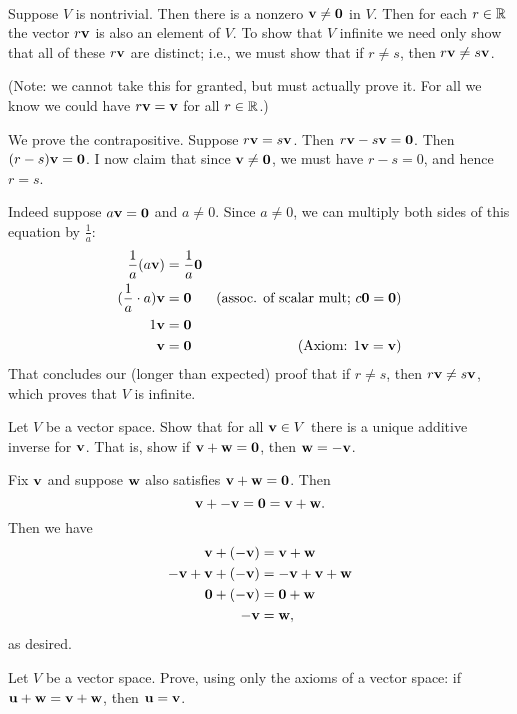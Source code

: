 \\
\begin{solution}
Suppose $V$ is nontrivial. Then there is a nonzero ${\mathbf v}\ne {\mathbf 0}$ in $V$. Then for each $r\in{\mathbb R}$ the vector $r{\mathbf v}$ is also an element of $V$. To show that $V$ infinite we need only show that all of these $r{\mathbf v}$ are distinct; i.e., we must show that if $r\ne s$, then $r{\mathbf v}\ne s{\mathbf v}$. 

(Note: we cannot take this for granted, but must actually prove it. For all we know we could have $r{\mathbf v}={\mathbf v}$ for all $r\in{\mathbb R}$.) 

We prove the contrapositive. Suppose $r{\mathbf v}=s{\mathbf v}$. Then $r{\mathbf v}-s{\mathbf v}={\mathbf 0}$. Then $(r-s){\mathbf v}={\mathbf 0}$. I now claim that since ${\mathbf v}\ne{\mathbf 0}$, we must have $r-s=0$, and hence $r=s$. 

Indeed suppose $a{\mathbf v}={\mathbf 0}$ and $a\ne 0$. Since $a\ne 0$, we can multiply both sides of this equation by $\frac{1}{a}$:
\begin{align*}
\frac{1}{a}(a{\mathbf v})&=\frac{1}{a}{\mathbf 0}\\
(\frac{1}{a}\cdot a){\mathbf v}&={\mathbf 0} &\text{(assoc. of scalar mult; $c{\mathbf 0}={\mathbf 0}$)}\\
1{\mathbf v}&={\mathbf 0}\\
{\mathbf v}&={\mathbf 0} &\text{(Axiom: $1{\mathbf v}={\mathbf v}$)}
\end{align*}
That concludes our (longer than expected) proof that if $r\ne s$, then $r{\mathbf v}\ne s{\mathbf v}$, which proves that $V$ is infinite. 
\end{solution}
\ii Let $V$ be a vector space. Show that for all ${\mathbf v}\in V$ there is a unique additive inverse for ${\mathbf v}$. That is, show if ${\mathbf v}+{\mathbf w}={\mathbf 0}$, then ${\mathbf w}=-{\mathbf v}$.  
\\
\begin{solution}
Fix ${\mathbf v}$ and suppose ${\mathbf w}$ also satisfies ${\mathbf v}+{\mathbf w}={\mathbf 0}$. Then  
\[
{\mathbf v}+-{\mathbf v}={\mathbf 0}={\mathbf v}+{\mathbf w}.
\]
Then we have 
\begin{align*}
{\mathbf v}+(-{\mathbf v})&={\mathbf v}+{\mathbf w}\\
-{\mathbf v}+{\mathbf v}+(-{\mathbf v})&=-{\mathbf v}+{\mathbf v}+{\mathbf w}\\
{\mathbf 0}+(-{\mathbf v})&={\mathbf 0}+{\mathbf w}\\
-{\mathbf v}&={\mathbf w},
\end{align*}
as desired. 
\end{solution}
\ii Let $V$ be a vector space. Prove, using only the axioms of a vector space: if ${\mathbf u} + {\mathbf w} = {\mathbf v} + {\mathbf w}$, then ${\mathbf u} = {\mathbf v}$.
